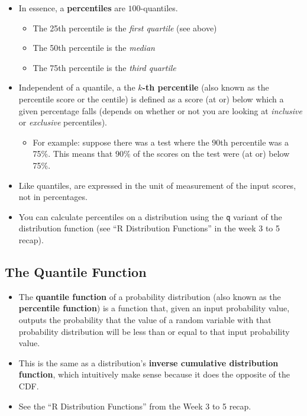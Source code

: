 \documentclass[12pt]{article}
\begin{document}
\begin{itemize}
	\item In essence, a \textbf{percentiles} are $100$-quantiles.
	      \begin{itemize}
		      \item The 25th percentile is the \emph{first quartile} (see above)
		      \item The 50th percentile is the \emph{median}
		      \item The 75th percentile is the \emph{third quartile}
	      \end{itemize}
	\item Independent of a quantile, a the \textbf{$k$-th percentile} (also
	      known as the percentile score or the centile) is defined as a score (at
	      or) below which a given percentage falls (depends on whether or not you
	      are looking at \emph{inclusive} or \emph{exclusive} percentiles).
	      \begin{itemize}
		      \item For example: suppose there was a test where the $90$th
		            percentile was a 75\%. This means that $90\%$ of the scores
		            on the test were (at or) below 75\%.
	      \end{itemize}
	\item Like quantiles, are expressed in the unit of measurement of the
	      input scores, not in percentages.
	\item You can calculate percentiles on a distribution using the
	      \verb|q| variant of the distribution function (see ``R
	      Distribution Functions'' in the week 3 to 5 recap).
\end{itemize}

\subsection{The Quantile Function}

\begin{itemize}
	\item The \textbf{quantile function} of a probability distribution (also
	      known as the \textbf{percentile function}) is a function that, given
	      an input probability value, outputs the probability that the value of
	      a random variable with that probability distribution will be less than
	      or equal to that input probability value.
	\item This is the same as a distribution's \textbf{inverse cumulative
		      distribution function}, which intuitively make sense because
	      it does the opposite of the CDF.
	\item See the ``R Distribution Functions'' from the Week 3 to 5 recap.
\end{itemize}
\end{document}
